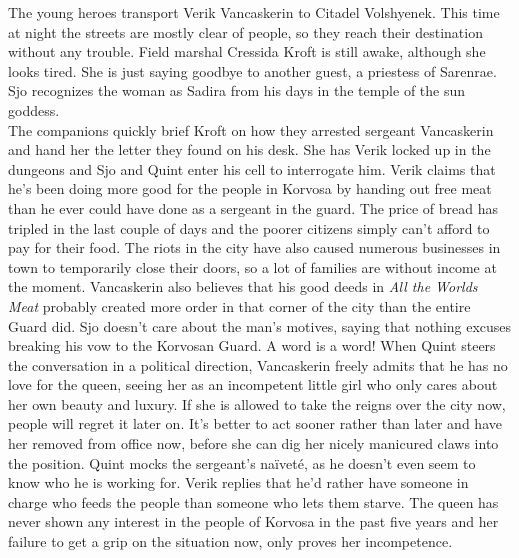 The young heroes transport Verik Vancaskerin to Citadel Volshyenek. This time at night the streets are mostly clear of people, so they reach their destination without any trouble. Field marshal Cressida Kroft is still awake, although she looks tired. She is just saying goodbye to another guest, a priestess of Sarenrae. Sjo recognizes the woman as Sadira from his days in the temple of the sun goddess.\\

The companions quickly brief Kroft on how they arrested sergeant Vancaskerin and hand her the letter they found on his desk. She has Verik locked up in the dungeons and Sjo and Quint enter his cell to interrogate him. Verik claims that he's been doing more good for the people in Korvosa by handing out free meat than he ever could have done as a sergeant in the guard. The price of bread has tripled in the last couple of days and the poorer citizens simply can't afford to pay for their food. The riots in the city have also caused numerous businesses in town to temporarily close their doors, so a lot of families are without income at the moment. Vancaskerin also believes that his good deeds in {\itshape All the Worlds Meat} probably created more order in that corner of the city than the entire Guard did. Sjo doesn't care about the man's motives, saying that nothing excuses breaking his vow to the Korvosan Guard. A word is a word! When Quint steers the conversation in a political direction, Vancaskerin freely admits that he has no love for the queen, seeing her as an incompetent little girl who only cares about her own beauty and luxury. If she is allowed to take the reigns over the city now, people will regret it later on. It's better to act sooner rather than later and have her removed from office now, before she can dig her nicely manicured claws into the position. Quint mocks the sergeant's na\"ivet\'e, as he doesn't even seem to know who he is working for. Verik replies that he'd rather have someone in charge who feeds the people than someone who lets them starve. The queen has never shown any interest in the people of Korvosa in the past five years and her failure to get a grip on the situation now, only proves her incompetence.\\

